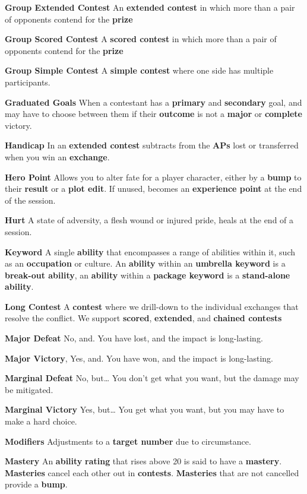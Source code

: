 \documentclass[
]{article}
\begin{document}
\textbf{Group Extended Contest} An \textbf{extended contest} in which
more than a pair of opponents contend for the \textbf{prize}

\textbf{Group Scored Contest} A \textbf{scored contest} in which more
than a pair of opponents contend for the \textbf{prize}

\textbf{Group Simple Contest} A \textbf{simple contest} where one side
has multiple participants.

\textbf{Graduated Goals} When a contestant has a \textbf{primary} and
\textbf{secondary} goal, and may have to choose between them if their
\textbf{outcome} is not a \textbf{major} or \textbf{complete} victory.

\textbf{Handicap} In an \textbf{extended contest} subtracts from the
\textbf{APs} lost or transferred when you win an \textbf{exchange}.

\textbf{Hero Point} Allows you to alter fate for a player character,
either by a \textbf{bump} to their \textbf{result} or a \textbf{plot
edit}. If unused, becomes an \textbf{experience point} at the end of the
session.

\textbf{Hurt} A state of adversity, a flesh wound or injured pride,
heals at the end of a session.

\textbf{Keyword} A single \textbf{ability} that encompasses a range of
abilities within it, such as an \textbf{occupation} or culture. An
\textbf{ability} within an \textbf{umbrella keyword} is a
\textbf{break-out ability}, an \textbf{ability} within a \textbf{package
keyword} is a \textbf{stand-alone ability}.

\textbf{Long Contest} A \textbf{contest} where we drill-down to the
individual exchanges that resolve the conflict. We support
\textbf{scored}, \textbf{extended}, and \textbf{chained contests}

\textbf{Major Defeat} No, and. You have lost, and the impact is
long-lasting.

\textbf{Major Victory}, Yes, and. You have won, and the impact is
long-lasting.

\textbf{Marginal Defeat} No, but\ldots{} You don't get what you want,
but the damage may be mitigated.

\textbf{Marginal Victory} Yes, but\ldots{} You get what you want, but
you may have to make a hard choice.

\textbf{Modifiers} Adjustments to a \textbf{target number} due to
circumstance.

\textbf{Mastery} An \textbf{ability} \textbf{rating} that rises above 20
is said to have a \textbf{mastery}. \textbf{Masteries} cancel each other
out in \textbf{contests}. \textbf{Masteries} that are not cancelled
provide a \textbf{bump}.
\end{document}
